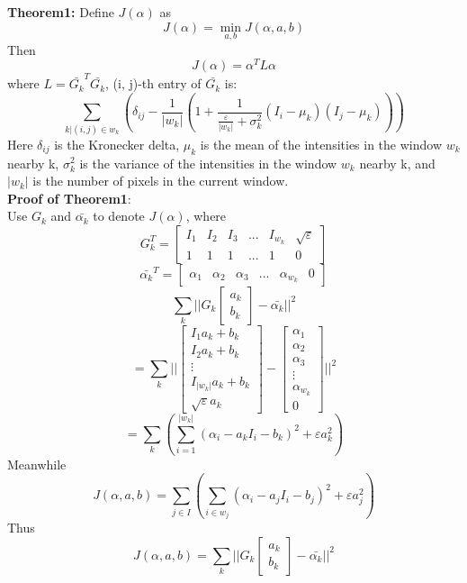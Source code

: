 \documentclass[11pt,letterpaper]{article}
\begin{document}
\textbf{Theorem1:} Define $J(\alpha)$ as 
$$J(\alpha) = \min_{a,b} J(\alpha, a, b)$$
Then
$$J(\alpha) = \alpha^T L \alpha$$
where $L = \bar{G_k}^T \bar{G_k}$, (i, j)-th entry of $\bar{G_k}$ is:
$$\sum_{k|(i, j) \in w_k}(\delta_{ij} - \frac{1}{|w_k|}(1+\frac{1}{\frac{\varepsilon}{|w_k|} + \sigma_k^2}(I_i - \mu_k)(I_j - \mu_k)))$$
Here $\delta_{ij}$ is the Kronecker delta, $\mu_k$ is the mean of the intensities in the window $w_k$  nearby k, $\sigma_k^2$ is the variance of the intensities in the window $w_k$  nearby k, and $|w_k|$ is the number of pixels in the current window. \\

\textbf{Proof of Theorem1}:\\

Use $G_k$ and $\bar{\alpha_k}$  to denote $J(\alpha)$, where
$$ G_k^T=
  \begin{bmatrix}
    I_1 & I_2 & I_3 & ... & I_{w_k} & \sqrt{\varepsilon}\\
    1 & 1 & 1 & ... & 1 & 0 
  \end{bmatrix} $$
$$ \bar{\alpha_k}^T=
  \begin{bmatrix}
    \alpha_1 & \alpha_2 & \alpha_3 & ... & \alpha_{w_k} & 0 
  \end{bmatrix} $$
$$\sum_{k}||G_k \begin{bmatrix} a_k \\ b_k\end{bmatrix} - \bar{\alpha_k}||^2$$
$$= \sum_k||\begin{bmatrix} I_{1} a_k + b_k \\ I_{2} a_k + b_k \\ \vdots \\ I_{|w_k|} a_k + b_k \\ \sqrt{\varepsilon} a_k \end{bmatrix} - 
\begin{bmatrix}
    \alpha_1 \\ \alpha_2 \\ \alpha_3 \\ \vdots\\ \alpha_{w_k} \\ 0 
\end{bmatrix}||^2$$
$$= \sum_{k}(\sum_{i = 1}^{|w_{k}|}(\alpha_i - a_kI_i-b_k)^2+\varepsilon a_k^2)$$
Meanwhile 
$$J(\alpha, a, b) = \sum_{j \in I}(\sum_{i \in w_j}(\alpha_i - a_jI_i-b_j)^2+\varepsilon a_j^2)$$
Thus
\begin{equation}
J(\alpha, a, b) = \sum_{k}||G_k \begin{bmatrix} a_k \\ b_k\end{bmatrix} - \bar{\alpha_k}||^2
\end{equation}
\end{document}
